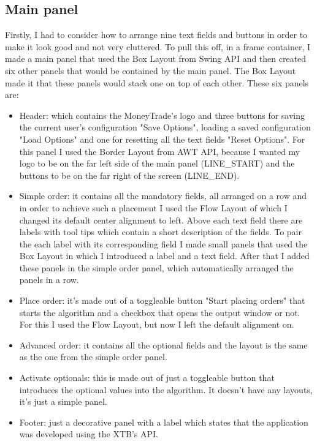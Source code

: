 \documentclass[12pt,a4paper]{report}
\begin{document}
\subsection{Main panel}
Firstly, I had to consider how to arrange nine text fields and buttons in order to make it look good and not very cluttered. To pull this off, in a frame container, I made a main panel that used the Box Layout from Swing API and then created six other panels that would be contained by the main panel. The Box Layout made it that these panels would stack one on top of each other. These six panels are:
\begin{itemize}
 	\item Header: which contains the MoneyTrade's logo and three buttons for saving the current user's configuration "Save Options", loading a saved configuration "Load Options" and one for resetting all the text fields "Reset Options". For this panel I used the Border Layout from AWT API, because I wanted my logo to be on the far left side of the main panel (LINE\_START) and the buttons to be on the far right of the screen (LINE\_END).   
 	\item Simple order: it contains all the mandatory fields, all arranged on a row and in order to achieve such a placement I used the Flow Layout of which I changed its default center alignment to left. Above each text field there are labels with tool tips which contain a short description of the fields. To pair the each label with its corresponding field I made small panels that used the Box Layout in which I introduced a label and a text field. After that I added these panels in the simple order panel, which automatically arranged the panels in a row.    
 	\item Place order: it's made out of a toggleable button "Start placing orders" that starts the algorithm and a checkbox that opens the output window or not. For this I used the Flow Layout, but now I left the default alignment on.  
 	\item Advanced order: it contains all the optional fields and the layout is the same as the one from the simple order panel.
 	\item Activate optionals: this is made out of just a toggleable button that introduces the optional values into the algorithm. It doesn't have any layouts, it's just a simple panel.
 	\item Footer: just a decorative panel with a label which states that the application was developed using the XTB's API. 
\end{itemize}
\end{document}

